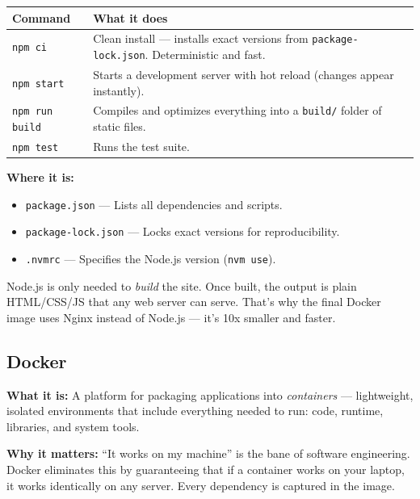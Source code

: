 \documentclass[11pt, letterpaper]{article}
\begin{document}
\begin{center}
\begin{tabularx}{0.9\textwidth}{lX}
\toprule
\textbf{Command} & \textbf{What it does} \\
\midrule
\texttt{npm ci} & Clean install --- installs exact versions from
                  \texttt{package-lock.json}. Deterministic and fast. \\
\texttt{npm start} & Starts a development server with hot reload
                     (changes appear instantly). \\
\texttt{npm run build} & Compiles and optimizes everything into a
                         \texttt{build/} folder of static files. \\
\texttt{npm test} & Runs the test suite. \\
\bottomrule
\end{tabularx}
\end{center}

\textbf{Where it is:}
\begin{itemize}[nosep]
  \item \texttt{package.json} --- Lists all dependencies and scripts.
  \item \texttt{package-lock.json} --- Locks exact versions for reproducibility.
  \item \texttt{.nvmrc} --- Specifies the Node.js version (\texttt{nvm use}).
\end{itemize}

\begin{tipbox}
Node.js is only needed to \textit{build} the site. Once built, the output is
plain HTML/CSS/JS that any web server can serve. That's why the final Docker
image uses Nginx instead of Node.js --- it's 10x smaller and faster.
\end{tipbox}

\subsection{Docker}

\textbf{What it is:} A platform for packaging applications into
\textit{containers} --- lightweight, isolated environments that include
everything needed to run: code, runtime, libraries, and system tools.

\textbf{Why it matters:} ``It works on my machine'' is the bane of software
engineering. Docker eliminates this by guaranteeing that if a container works
on your laptop, it works identically on any server. Every dependency is
captured in the image.
\end{document}
